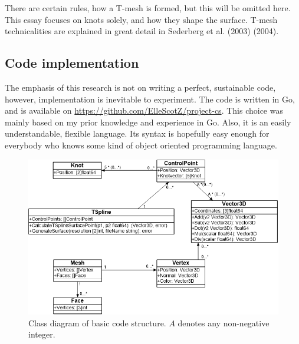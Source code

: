 \documentclass{article}
\begin{document}
There are certain rules, how a T-mesh is formed, but this will be omitted here. This essay focuses on knots solely, and how they shape the surface. T-mesh technicalities are explained in great detail in Sederberg et al. (2003) (2004).

\vspace{12pt}

\begin{large}
\section{Code implementation}
\end{large}

\vspace{12pt}

The emphasis of this research is not on writing a perfect, sustainable code, however, implementation is inevitable to experiment. The code is written in Go, and is available on \url{https://github.com/ElleScotZ/project-cs}. This choice was mainly based on my prior knowledge and experience in Go. Also, it is an easily understandable, flexible language. Its syntax is hopefully easy enough for everybody who knows some kind of object oriented programming language.

\begin{figure}[H]
\centering
\includegraphics[width=\textwidth]{CD}
\caption{Class diagram of basic code structure. $A$ denotes any non-negative integer.}
\label{classdiagram}
\end{figure}
\end{document}
